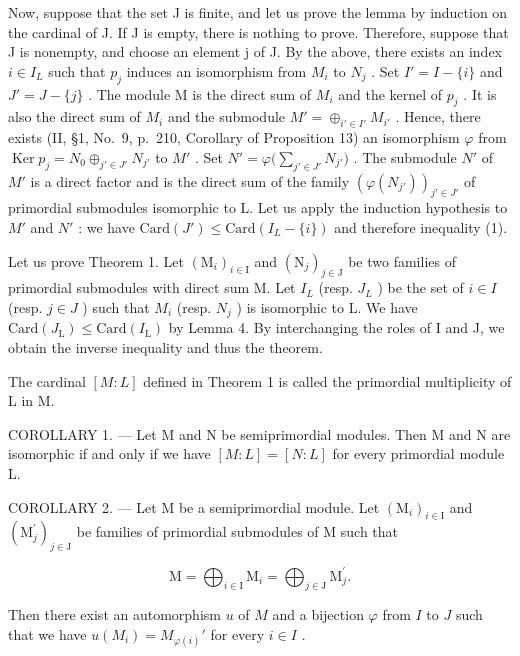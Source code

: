 Now, suppose that the set J is finite, and let us prove the lemma by induction on the cardinal of J. If J is empty, there is nothing to prove. Therefore, suppose that J is nonempty, and choose an element j of J. By the above, there exists an index \(i \in I_{L}\) such that \(p_{j}\) induces an isomorphism from \(M_{i}\) to \(N_{j}\) . Set \(I' = I - \{i\}\) and \(J' = J - \{j\}\) . The module M is the direct sum of \(M_{i}\) and the kernel of \(p_{j}\) . It is also the direct sum of \(M_{i}\) and the submodule \(M' = \oplus_{i' \in I'} M_{i'}\) . Hence, there exists (II, §1, No.~9, p.~210, Corollary of Proposition 13) an isomorphism \(\varphi\) from \(\operatorname{Ker} p_{j} = N_{0} \oplus_{j' \in J'} N_{j'}\) to \(M'\) . Set \(N' = \varphi\big(\sum_{j' \in J'} N_{j'}\big)\) . The submodule \(N'\) of \(M'\) is a direct factor and is the direct sum of the family \((\varphi(N_{j'}))_{j' \in J'}\) of primordial submodules isomorphic to L. Let us apply the induction hypothesis to \(M'\) and \(N'\) : we have \(\text{Card}(J') \leqslant \text{Card}(I_L - \{i\})\) and therefore inequality (1).

Let us prove Theorem 1. Let \((\mathrm{M}_{i})_{i\in\mathrm{I}}\) and \((\mathrm{N}_{j})_{j\in\mathrm{J}}\) be two families of primordial submodules with direct sum M. Let \(I_{L}\) (resp. \(J_{L}\) ) be the set of \(i\in I\) (resp. \(j\in J\) ) such that \(M_{i}\) (resp. \(N_{j}\) ) is isomorphic to L. We have \(\mathrm{Card}(J_{\mathrm{L}})\leqslant\mathrm{Card}(I_{\mathrm{L}})\) by Lemma 4. By interchanging the roles of I and J, we obtain the inverse inequality and thus the theorem.

The cardinal \([M : L]\) defined in Theorem 1 is called the primordial multiplicity of L in M.

COROLLARY 1. --- Let M and N be semiprimordial modules. Then M and N are isomorphic if and only if we have \([M:L]=[N:L]\) for every primordial module L.

COROLLARY 2. --- Let M be a semiprimordial module. Let \((\mathrm{M}_{i})_{i\in\mathrm{I}}\) and \((\mathrm{M}_{j}^{\prime})_{j\in\mathrm{J}}\) be families of primordial submodules of M such that

\[
\mathrm{M} = \bigoplus_ {i \in \mathrm{I}} \mathrm{M} _ {i} = \bigoplus_ {j \in \mathrm{J}} \mathrm{M} _ {j} ^ {\prime}.
\]

Then there exist an automorphism \(u\) of \(M\) and a bijection \(\varphi\) from \(I\) to \(J\) such that we have \(u(M_i) = M_{\varphi(i)}'\) for every \(i \in I\) .

